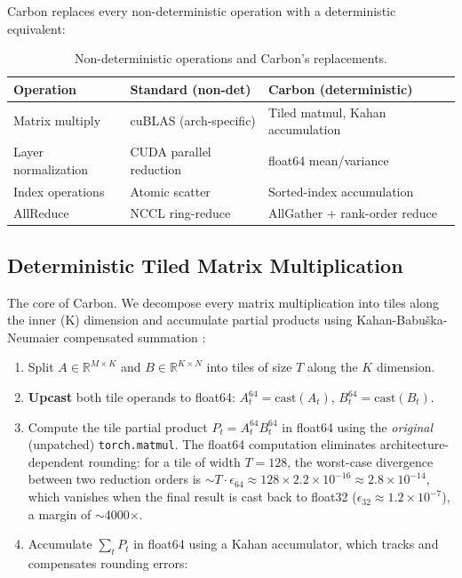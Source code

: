 \documentclass[11pt,a4paper]{article}
\begin{document}
Carbon replaces every non-deterministic operation with a deterministic equivalent:

\begin{table}[h]
\centering
\caption{Non-deterministic operations and Carbon's replacements.}
\begin{tabular}{lll}
\toprule
Operation & Standard (non-det) & Carbon (deterministic) \\
\midrule
Matrix multiply & cuBLAS (arch-specific) & Tiled matmul, Kahan accumulation \\
Layer normalization & CUDA parallel reduction & float64 mean/variance \\
Index operations & Atomic scatter & Sorted-index accumulation \\
AllReduce & NCCL ring-reduce & AllGather + rank-order reduce \\
\bottomrule
\end{tabular}
\end{table}

\subsection{Deterministic Tiled Matrix Multiplication}

The core of Carbon. We decompose every matrix multiplication into tiles along
the inner (K) dimension and accumulate partial products using Kahan-Babu\v{s}ka-Neumaier
compensated summation \cite{kahan1965,neumaier1974}:

\begin{enumerate}
  \item Split $A \in \mathbb{R}^{M \times K}$ and $B \in \mathbb{R}^{K \times N}$
    into tiles of size $T$ along the $K$ dimension.
  \item \textbf{Upcast} both tile operands to float64: $A_t^{64} = \text{cast}(A_t)$,
    $B_t^{64} = \text{cast}(B_t)$.
  \item Compute the tile partial product $P_t = A_t^{64} B_t^{64}$ in float64
    using the \emph{original} (unpatched) \texttt{torch.matmul}. The float64
    computation eliminates architecture-dependent rounding: for a tile of width
    $T = 128$, the worst-case divergence between two reduction orders is
    $\sim T \cdot \epsilon_{64} \approx 128 \times 2.2 \times 10^{-16} \approx
    2.8 \times 10^{-14}$, which vanishes when the final result is cast back to
    float32 ($\epsilon_{32} \approx 1.2 \times 10^{-7}$), a margin of
    $\sim$4000$\times$.
  \item Accumulate $\sum_t P_t$ in float64 using a Kahan accumulator, which
    tracks and compensates rounding errors:
\end{enumerate}
\end{document}
